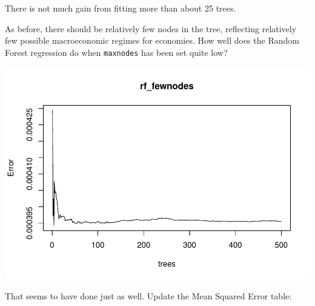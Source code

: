 \documentclass[]{article}
\newenvironment{Shaded}{\begin{snugshade}}{\end{snugshade}}
\newcommand{\KeywordTok}[1]{\textcolor[rgb]{0.13,0.29,0.53}{\textbf{#1}}}
\newcommand{\DataTypeTok}[1]{\textcolor[rgb]{0.13,0.29,0.53}{#1}}
\newcommand{\DecValTok}[1]{\textcolor[rgb]{0.00,0.00,0.81}{#1}}
\newcommand{\StringTok}[1]{\textcolor[rgb]{0.31,0.60,0.02}{#1}}
\newcommand{\OperatorTok}[1]{\textcolor[rgb]{0.81,0.36,0.00}{\textbf{#1}}}
\newcommand{\NormalTok}[1]{#1}
\begin{document}
There is not much gain from fitting more than about 25 trees.

As before, there should be relatively few nodes in the tree, reflecting
relatively few possible macroeconomic regimes for economies. How well
does the Random Forest regression do when \texttt{maxnodes} has been set
quite low?

\begin{Shaded}
\end{Shaded}

\includegraphics{Econometric_FX_Forecasting_files/figure-latex/rf_fewnodes-1.pdf}

That seems to have done just as well. Update the Mean Squared Error
table:
\end{document}
